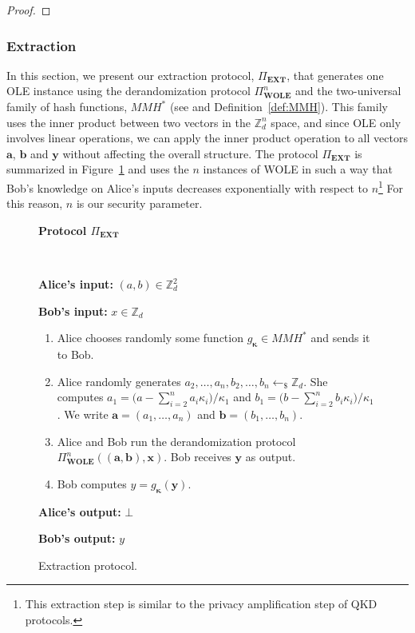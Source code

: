 \begin{proof}
\end{proof}




\subsubsection{Extraction}

 In this section, we present our extraction protocol, $\Pi_{\textbf{EXT}}$,  that generates one OLE instance using the derandomization protocol $\Pi^n_{\textbf{WOLE}}$ and the two-universal family of hash functions, $MMH^*$ (see \cite{HK97} and Definition~\ref{def:MMH}). This family uses the inner product between two vectors in the $\mathbb{Z}^n_d$ space, and since OLE only involves linear operations, we can apply the inner product operation to all vectors $\bm{a}$, $\bm{b}$ and $\bm{y}$ without affecting the overall structure. The protocol $\Pi_{\textbf{EXT}}$ is summarized in Figure~\ref{fig:privacy_amplification} and uses the $n$ instances of WOLE in such a way that Bob's knowledge on Alice's inputs decreases exponentially with respect to $n$\footnote{ This extraction step is similar to the privacy amplification step of QKD protocols.}  For this reason, $n$ is our security parameter.

\begin{figure}[h!]
    \centering
        \begin{tcolorbox}
            
            \centerline{\textbf{Protocol $\Pi_{\textbf{EXT}}$}}
            
            \
            
    \textbf{Alice's input:} $(a, b) \in\mathbb{Z}_d^2$ 
    
    \textbf{Bob's input:} $x \in\mathbb{Z}_d$
    
\begin{enumerate}
    \item Alice chooses randomly some function $g_{\bm{\kappa}} \in MMH^*$ and sends it to Bob.
    \item  Alice randomly generates $a_2, \ldots, a_n, b_2, \ldots, b_n\leftarrow_{\$}\mathbb{Z}_d$. She computes $a_1 = \big(a - \sum_{i=2}^{n} a_i \kappa_i\big)/\kappa_1$ and $b_1 = \big(b - \sum_{i=2}^{n} b_i \kappa_i\big)/\kappa_1$. We write $\bm{a} = (a_1, \ldots, a_n)$ and $\bm{b} = (b_1, \ldots, b_n)$.
    \item Alice and Bob run the derandomization protocol $\Pi^n_{\textbf{WOLE}}((\bm{a}, \bm{b}), \bm{x})$. Bob receives  $\bm{y}$ as output.
    
    \item Bob computes $y = g_{\bm{\kappa}}(\bm{y})$.
\end{enumerate}

\textbf{Alice's output:} $\bot$

\textbf{Bob's output:} $y$
        
        \end{tcolorbox}
\caption{Extraction protocol.}
\label{fig:privacy_amplification}
\end{figure}

